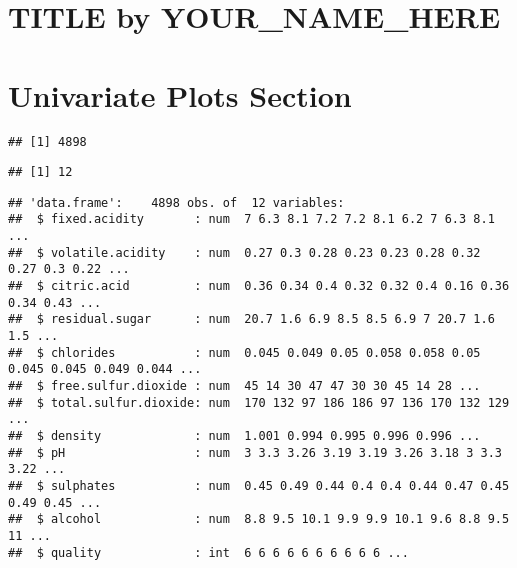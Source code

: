 \documentclass[]{article}
\title{}
\author{}
\date{}
\begin{document}
\section{TITLE by YOUR\_NAME\_HERE}\label{title-by-yourux5fnameux5fhere}

\section{Univariate Plots Section}\label{univariate-plots-section}

\begin{verbatim}
## [1] 4898
\end{verbatim}

\begin{verbatim}
## [1] 12
\end{verbatim}

\begin{verbatim}
## 'data.frame':    4898 obs. of  12 variables:
##  $ fixed.acidity       : num  7 6.3 8.1 7.2 7.2 8.1 6.2 7 6.3 8.1 ...
##  $ volatile.acidity    : num  0.27 0.3 0.28 0.23 0.23 0.28 0.32 0.27 0.3 0.22 ...
##  $ citric.acid         : num  0.36 0.34 0.4 0.32 0.32 0.4 0.16 0.36 0.34 0.43 ...
##  $ residual.sugar      : num  20.7 1.6 6.9 8.5 8.5 6.9 7 20.7 1.6 1.5 ...
##  $ chlorides           : num  0.045 0.049 0.05 0.058 0.058 0.05 0.045 0.045 0.049 0.044 ...
##  $ free.sulfur.dioxide : num  45 14 30 47 47 30 30 45 14 28 ...
##  $ total.sulfur.dioxide: num  170 132 97 186 186 97 136 170 132 129 ...
##  $ density             : num  1.001 0.994 0.995 0.996 0.996 ...
##  $ pH                  : num  3 3.3 3.26 3.19 3.19 3.26 3.18 3 3.3 3.22 ...
##  $ sulphates           : num  0.45 0.49 0.44 0.4 0.4 0.44 0.47 0.45 0.49 0.45 ...
##  $ alcohol             : num  8.8 9.5 10.1 9.9 9.9 10.1 9.6 8.8 9.5 11 ...
##  $ quality             : int  6 6 6 6 6 6 6 6 6 6 ...
\end{verbatim}
\end{document}
